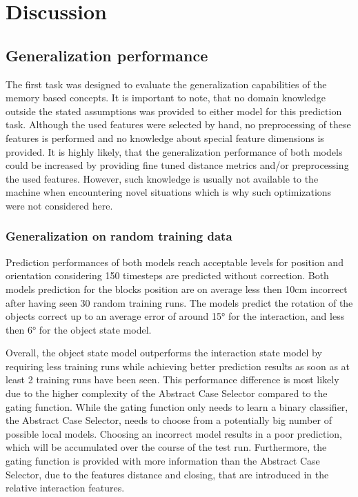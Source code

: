 \chapter{Discussion \label{chap:discussion}}

\section{Generalization performance}

The first task was designed to evaluate the generalization capabilities of the memory based concepts. It is important to note, that no domain knowledge outside the stated assumptions was provided to either model for this prediction task. Although the used features were selected by hand, no preprocessing of these features is performed and no knowledge about special feature dimensions is provided. It is highly likely, that the generalization performance of both models could be increased by providing fine tuned distance metrics and/or preprocessing the used features.
However, such knowledge is usually not available to the machine when encountering novel situations which is why such optimizations were not considered here.

\subsection{Generalization on random training data}

Prediction performances of both models reach acceptable levels for position and orientation considering 150 timesteps are predicted without correction. 
Both models prediction for the blocks position are on average less then 10cm incorrect after having seen 30 random training runs. The models predict the rotation of the objects correct up to an average error of around 15° for the interaction, and less then 6° for the object state model.

Overall, the object state model outperforms the interaction state model by requiring less training runs while achieving better prediction results as soon as at least 2 training runs have been seen.
This performance difference is most likely due to the higher complexity of the Abstract Case Selector compared to the gating function. While the gating function only needs to learn a binary classifier, the Abstract Case Selector, needs to choose from a potentially big number of possible local models. Choosing an incorrect model results in a poor prediction, which will be accumulated over the course of the test run. Furthermore, the gating function is provided with more information than the Abstract Case Selector, due to the features distance and closing, that are introduced in the relative interaction features. 

